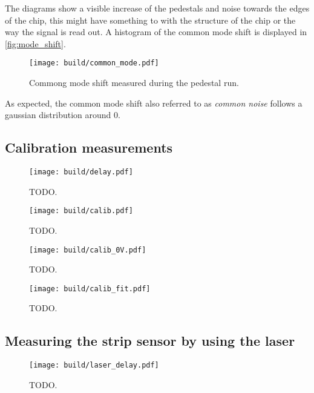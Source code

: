 The diagrams show a visible increase of the pedestals and noise towards the edges of the chip,
this might have something to with the structure of the chip or the way the signal is read out.
A histogram of the common mode shift is displayed in \autoref{fig:mode_shift}.

\begin{figure}[H]
  \centering
  \texttt{[image: build/common\_mode.pdf]}
  \caption{Commong mode shift measured during the pedestal run.}
  \label{fig:mode_shift}
\end{figure}

As expected, the common mode shift also referred to as \textit{common noise} follows a gaussian
distribution around $0$.

\subsection{Calibration measurements}



\begin{figure}[H]
  \centering
  \texttt{[image: build/delay.pdf]}
  \caption{TODO.}
  \label{fig:delay}
\end{figure}

\begin{figure}[H]
  \centering
  \texttt{[image: build/calib.pdf]}
  \caption{TODO.}
  \label{fig:calib}
\end{figure}

\begin{figure}[H]
  \centering
  \texttt{[image: build/calib\_0V.pdf]}
  \caption{TODO.}
  \label{fig:calib_0V}
\end{figure}

\begin{figure}[H]
  \centering
  \texttt{[image: build/calib\_fit.pdf]}
  \caption{TODO.}
  \label{fig:calib_fit}
\end{figure}

\subsection{Measuring the strip sensor by using the laser}

\begin{figure}[H]
  \centering
  \texttt{[image: build/laser\_delay.pdf]}
  \caption{TODO.}
  \label{fig:laser_delay}
\end{figure}

